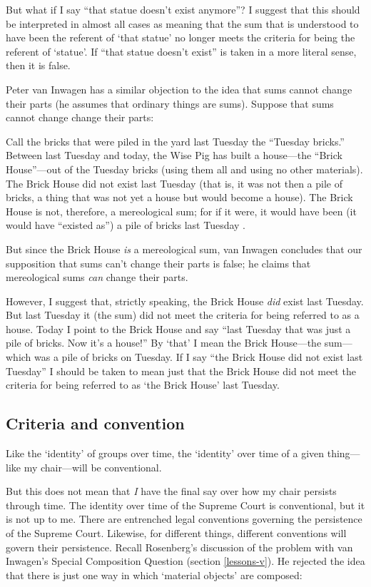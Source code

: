 \documentclass[11pt]{article}
\newenvironment{squote}{%
\begin{spacing}{1}
\begin{list}{}{%
\setlength{\labelwidth}{0pt}%
\rightmargin\leftmargin%
}
\item\relax
}{%
\end{list}%
\end{spacing}
}
\begin{document}
\begin{spacing}{1.5}
But what if I say ``that statue doesn't exist anymore''?  I suggest
that this should be interpreted in almost all cases as meaning that
the sum that is understood to have been the referent of `that statue'
no longer meets the criteria for being the referent of `statue'.  If
``that statue doesn't exist'' is taken in a more literal sense, then
it is false.

Peter van Inwagen has a similar objection to the idea that sums cannot
change their parts (he assumes that ordinary things are sums).
Suppose that sums cannot change change their parts:

\begin{squote}
Call the bricks that were piled in the yard last Tuesday the ``Tuesday
bricks.''  Between last Tuesday and today, the Wise Pig has built a
house---the ``Brick House''---out of the Tuesday bricks (using them
all and using no other materials).  The Brick House did not exist last
Tuesday (that is, it was not then a pile of bricks, a thing that was
not yet a house but would become a house).  The Brick House is not,
therefore, a mereological sum; for if it were, it would have been (it
would have ``existed as'') a pile of bricks last Tuesday
\citeyearpar[616]{inwagen2006}.
\end{squote}

But since the Brick House {\em is} a mereological sum, van Inwagen
concludes that our supposition that sums can't change their parts is
false; he claims that mereological sums {\em can} change their parts.

However, I suggest that, strictly speaking, the Brick House {\em did}
exist last Tuesday.  But last Tuesday it (the sum) did not meet the
criteria for being referred to as a house.  Today I point to the Brick
House and say ``last Tuesday that was just a pile of bricks.  Now it's
a house!''  By `that' I mean the Brick House---the sum---which was a
pile of bricks on Tuesday.  If I say ``the Brick House did not exist
last Tuesday'' I should be taken to mean just that the Brick House did
not meet the criteria for being referred to as `the Brick House' last
Tuesday.

\subsection{Criteria and convention}
\label{criteria}
Like the `identity' of groups over time, the `identity' over time of a
given thing---like my chair---will be conventional.

But this does not mean that {\em I} have the final say over how my
chair persists through time.  The identity over time of the Supreme
Court is conventional, but it is not up to me.  There are entrenched
legal conventions governing the persistence of the Supreme Court.
Likewise, for different things, different conventions will govern
their persistence.  Recall Rosenberg's discussion of the problem with
van Inwagen's Special Composition Question (section \ref{lessons-v}).
He rejected the idea that there is just one way in which `material
objects' are composed:


\end{spacing}
\end{document}

